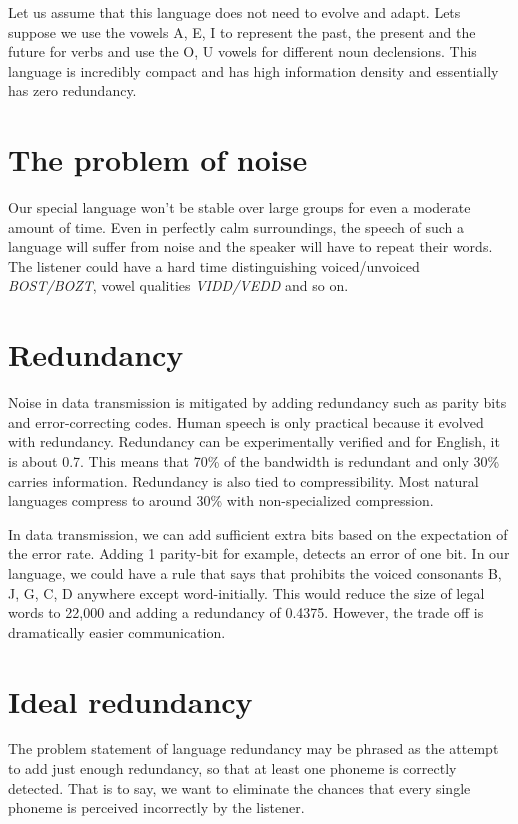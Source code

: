 \documentclass{article}
\begin{document}
Let us assume that this language does not need to evolve and adapt. Lets suppose we use the vowels A, E, I to represent the past, the present and the future for verbs and use the O, U vowels for different noun declensions. This language is incredibly compact and has high information density and essentially has zero redundancy. 

\section{The problem of noise}

Our special language won't be stable over large groups for even a moderate amount of time. Even in perfectly calm surroundings, the speech of such a language will suffer from noise and the speaker will have to repeat their words. The listener could have a hard time distinguishing voiced/unvoiced \emph{BOST/BOZT}, vowel qualities \emph{VIDD/VEDD} and so on.

\section{Redundancy}

Noise in data transmission is mitigated by adding redundancy such as parity bits and error-correcting codes. Human speech is only practical because it evolved with redundancy. Redundancy can be experimentally verified and for English, it is about 0.7. This means that 70\% of the bandwidth is redundant and only 30\% carries information. Redundancy is also tied to compressibility. Most natural languages compress to around 30\% with non-specialized compression.

In data transmission, we can add sufficient extra bits based on the expectation of the error rate. Adding 1 parity-bit for example, detects an error of one bit. In our language, we could have a rule that says that prohibits the voiced consonants B, J, G, C, D anywhere except word-initially. This would reduce the size of legal words to 22,000 and adding a redundancy of 0.4375. However, the trade off is dramatically easier communication. 

\section{Ideal redundancy}

The problem statement of language redundancy may be phrased as the attempt to add just enough redundancy, so that at least one phoneme is correctly detected. That is to say, we want to eliminate the chances that every single phoneme is perceived incorrectly by the listener.
\end{document}
